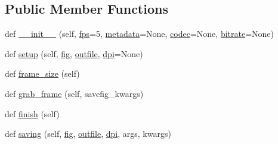 \subsection*{Public Member Functions}
\begin{DoxyCompactItemize}
\item 
def \hyperlink{classmatplotlib_1_1animation_1_1AbstractMovieWriter_ae4eb9257de1f99c7c920aa980e138aab}{\+\_\+\+\_\+init\+\_\+\+\_\+} (self, \hyperlink{classmatplotlib_1_1animation_1_1AbstractMovieWriter_aaf7656da4e1f760b64f453cffbe15a82}{fps}=5, \hyperlink{classmatplotlib_1_1animation_1_1AbstractMovieWriter_a5a23958781c90f0aae7ac29ef6a7401f}{metadata}=None, \hyperlink{classmatplotlib_1_1animation_1_1AbstractMovieWriter_a0f1f647083b08f59de77ec4a3692e465}{codec}=None, \hyperlink{classmatplotlib_1_1animation_1_1AbstractMovieWriter_a8437f6e4c409bdd6392b1d354e9bc4c5}{bitrate}=None)
\item 
def \hyperlink{classmatplotlib_1_1animation_1_1AbstractMovieWriter_ac9a9c1598d0a28907b4501abc3831fc7}{setup} (self, \hyperlink{classmatplotlib_1_1animation_1_1AbstractMovieWriter_a835eff7e0ac625992e7f708448e88fa6}{fig}, \hyperlink{classmatplotlib_1_1animation_1_1AbstractMovieWriter_ae2006c1ca69618ec02514264a9f318e1}{outfile}, \hyperlink{classmatplotlib_1_1animation_1_1AbstractMovieWriter_aaca5ed6ef95c99e03830b346425ee9bc}{dpi}=None)
\item 
def \hyperlink{classmatplotlib_1_1animation_1_1AbstractMovieWriter_a2586c7793164a329fb93f0db66edeb0f}{frame\+\_\+size} (self)
\item 
def \hyperlink{classmatplotlib_1_1animation_1_1AbstractMovieWriter_a995dae01d233d2fcce6f4f510f43f548}{grab\+\_\+frame} (self, savefig\+\_\+kwargs)
\item 
def \hyperlink{classmatplotlib_1_1animation_1_1AbstractMovieWriter_abc294f9c3518a3c7fcd45c3e2c79a396}{finish} (self)
\item 
def \hyperlink{classmatplotlib_1_1animation_1_1AbstractMovieWriter_ae501c524249d79a7a648c3d383a55758}{saving} (self, \hyperlink{classmatplotlib_1_1animation_1_1AbstractMovieWriter_a835eff7e0ac625992e7f708448e88fa6}{fig}, \hyperlink{classmatplotlib_1_1animation_1_1AbstractMovieWriter_ae2006c1ca69618ec02514264a9f318e1}{outfile}, \hyperlink{classmatplotlib_1_1animation_1_1AbstractMovieWriter_aaca5ed6ef95c99e03830b346425ee9bc}{dpi}, args, kwargs)
\end{DoxyCompactItemize}
